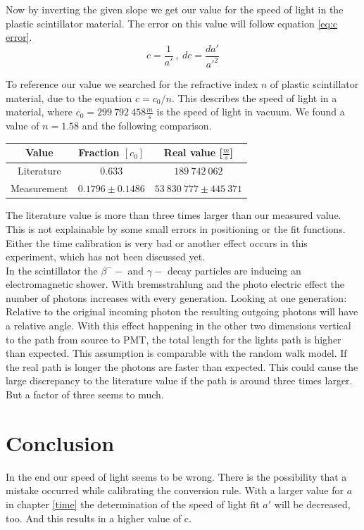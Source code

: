 \documentclass[]{article}
\begin{document}
Now by inverting the given slope we get our value for the speed of light in the plastic scintillator material. The error on this value will follow equation \ref{eq:c error}.
\begin{equation} \label{eq:c error}
c=\frac{1}{a'}\:,\: dc=\frac{da'}{a'^2}
\end{equation}

To reference our value we searched for the refractive index $n$ of plastic scintillator material, due to the equation $ c= c_0 / n$. This describes the speed of light in a material, where $c_0 = 299\ 792\ 458 \frac{m}{s}$ is the speed of light in vacuum. We found a value of $n=1.58$ \cite{refractive index} and the following comparison.

\begin{table}[H]
\centering
\begin{tabular}{c|c|c}
Value & Fraction $[c_0]$ & Real value [$\frac{m}{s}$] \\ \hline \hline
Literature & $0.633$ & $189\ 742\ 062$  \\ \hline
Measurement & $0.1796 \pm 0.1486$ & $ 53\ 830\ 777 \pm 445\ 371$ \\ \hline
\end{tabular}
\end{table}

The literature value is more than three times larger than our measured value. This is not explainable by some small errors in positioning or the fit functions. Either the time calibration is very bad or another effect occurs in this experiment, which has not been discussed yet.\\

In the scintillator the $\beta^- - $ and $\gamma -$ decay particles are inducing an electromagnetic shower. With bremsstrahlung and the photo electric effect the number of photons increases with every generation. Looking at one generation: Relative to the original incoming photon the resulting outgoing photons will have a relative angle. With this effect happening in the other two dimensions vertical to the path from source to PMT, the total length for the lights path is higher than expected. This assumption is comparable with the random walk model. If the real path is longer the photons are faster than expected. This could cause the large discrepancy to the literature value if the path is around three times larger. But a factor of three seems to much.


\section{Conclusion}
In the end our speed of light seems to be wrong. There is the possibility that a mistake occurred while calibrating the conversion rule. With a larger value for $a$ in chapter \ref{time} the determination of the speed of light fit $a'$ will be decreased, too. And this results in a higher value of c.
\end{document}
